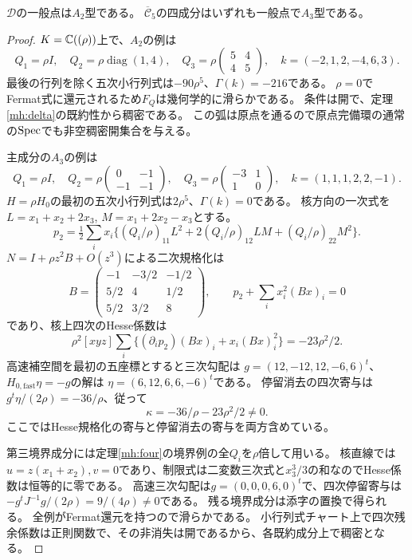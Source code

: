 \begin{proposition}[非空性と四成分の一般型]\label{mh:examples}
$\mathcal D$の一般点は$A_2$型である。
$\overline{\mathcal C}_5$の四成分はいずれも一般点で$A_3$型である。
\end{proposition}
\begin{proof}
$K=\mathbb C((\rho))$上で、$A_2$の例は
\[
 Q_1=\rho I,\quad Q_2=\rho\operatorname{diag}(1,4),\quad
 Q_3=\rho\begin{pmatrix}5&4\\4&5\end{pmatrix},\quad
 k=(-2,1,2,-4,6,3).
\]
最後の行列を除く五次小行列式は$-90\rho^5$、$\Gamma(k)=-216$である。
$\rho=0$でFermat式に還元されるため$F_Q$は幾何学的に滑らかである。
条件は開で、定理\ref{mh:delta}の既約性から稠密である。
この弧は原点を通るので原点完備環の通常の$\operatorname{Spec}$でも非空稠密開集合を与える。

主成分の$A_3$の例は
\[
 Q_1=\rho I,\quad Q_2=\rho\begin{pmatrix}0&-1\\-1&-1\end{pmatrix},\quad
 Q_3=\rho\begin{pmatrix}-3&1\\1&0\end{pmatrix},\quad
 k=(1,1,1,2,2,-1).
\]
$H=\rho H_0$の最初の五次小行列式は$2\rho^5$、$\Gamma(k)=0$である。
核方向の一次式を$L=x_1+x_2+2x_3$, $M=x_1+2x_2-x_3$とする。
\[
 p_2=\tfrac12\sum_i x_i\{(Q_i/\rho)_{11}L^2+
 2(Q_i/\rho)_{12}LM+(Q_i/\rho)_{22}M^2\}.
\]
$N=I+\rho z^2 B+O(z^3)$による二次規格化は
\[
 B=\begin{pmatrix}-1&-3/2&-1/2\\5/2&4&1/2\\5/2&3/2&8\end{pmatrix},
 \qquad p_2+\sum_i x_i^2(Bx)_i=0
\]
であり、核上四次のHesse係数は
\[
 \rho^2[xyz]\sum_i\{(\partial_i p_2)(Bx)_i+x_i(Bx)_i^2\}
 =-23\rho^2/2.
\]
高速補空間を最初の五座標とすると三次勾配は
$g=(12,-12,12,-6,6)^t$、$H_{0,\mathrm{fast}}\eta=-g$の解は
$\eta=(6,12,6,6,-6)^t$である。
停留消去の四次寄与は$g^t\eta/(2\rho)=-36/\rho$、従って
\[
 \kappa=-36/\rho-23\rho^2/2\ne0.
\]
ここではHesse規格化の寄与と停留消去の寄与を両方含めている。

第三境界成分には定理\ref{mh:four}の境界例の全$Q_i$を$\rho$倍して用いる。
核直線では$u=z(x_1+x_2),v=0$であり、制限式は二変数三次式と$x_3^3/3$の和なのでHesse係数は恒等的に零である。
高速三次勾配は$g=(0,0,0,6,0)^t$で、四次停留寄与は
$-g^tJ^{-1}g/(2\rho)=9/(4\rho)\ne0$である。
残る境界成分は添字の置換で得られる。
全例がFermat還元を持つので滑らかである。
小行列式チャート上で四次残余係数は正則関数で、その非消失は開であるから、各既約成分上で稠密となる。
\end{proof}

